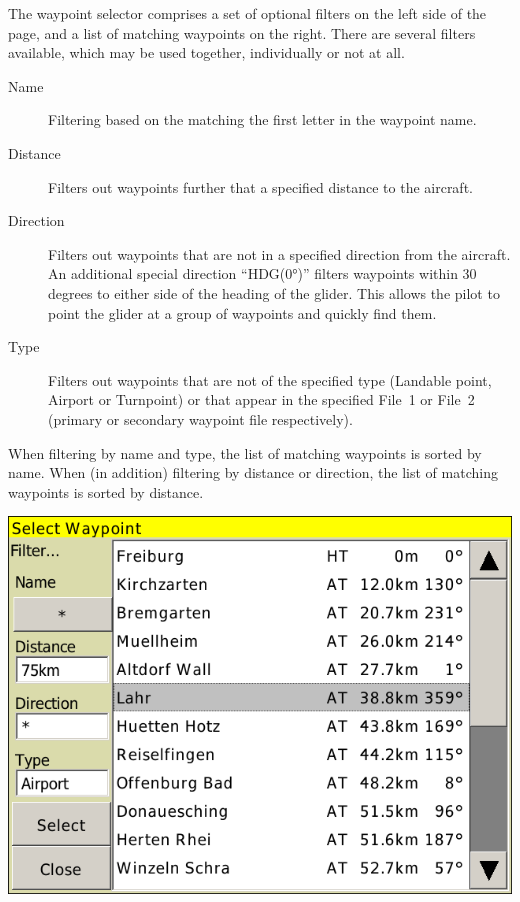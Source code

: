 \documentclass[a4paper,12pt]{refrep}
\begin{document}
The waypoint selector comprises a set of optional filters on the left
side of the page, and a list of matching waypoints on the right.
There are several filters available, which may be used together,
individually or not at all.
\begin{description}
\item[Name] Filtering based on the matching the first letter in the waypoint name. 
\item[Distance] Filters out waypoints further that a specified distance to the aircraft.
\item[Direction] Filters out waypoints that are not in a specified direction from the aircraft. 
   An additional special direction ``HDG(0°)'' filters waypoints within 30
   degrees to either side of the heading of the glider.  This allows the pilot to point the glider at a group of
  waypoints and quickly find them.
\item[Type] Filters out waypoints that are not of the specified type
(Landable point, Airport or Turnpoint) or that appear in the specified File~1 or
File~2 (primary or secondary waypoint file respectively).
\end{description}
When filtering by name and type, the list of matching waypoints is
sorted by name. When (in addition) filtering by distance or direction,
 the list of matching waypoints is sorted by distance.

\begin{center}
\includegraphics[angle=0,width=\linewidth,keepaspectratio='true']{figures/dialog-waypointselect.png}
\end{center}
\end{document}

